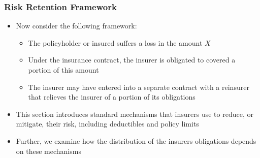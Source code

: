 \documentclass{beamer}
\begin{document}
\begin{frame}[shrink=2]
\frametitle{Risk Retention Framework}
\begin{itemize}
\item Now consider the following framework: \vspace{2mm}

\begin{itemize}
\item The policyholder or insured suffers a loss in the amount $X$ \vspace{2mm}

\item Under the insurance contract, the insurer is obligated to covered a portion of this
amount \vspace{2mm}

\item The insurer may have entered into a separate contract with a reinsurer that relieves the insurer of a portion of its
obligations \vspace{2mm}
\end{itemize}

\item This section introduces standard mechanisms that insurers use to reduce, or mitigate, their risk, including deductibles and policy
limits \vspace{2mm}

\item Further, we examine how the distribution of the insurers obligations depends on these mechanisms
\end{itemize}
\end{frame}
\end{document}
